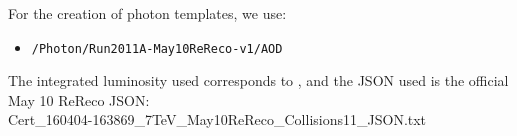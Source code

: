 For the creation of photon templates, we use:

\begin{itemize}
\item \verb=/Photon/Run2011A-May10ReReco-v1/AOD=
\end{itemize}

The integrated luminosity used corresponds to \lumi, and the JSON used is 
the official May 10 ReReco JSON:
\\
Cert\_160404-163869\_7TeV\_May10ReReco\_Collisions11\_JSON.txt

